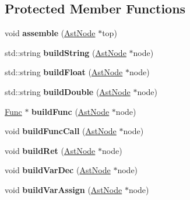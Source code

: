 \subsection*{Protected Member Functions}
\begin{DoxyCompactItemize}
\item 
\mbox{\label{classPasmBuilder_a463abff1f78a43e9d54787b6ceeb9d7e}} 
void {\bfseries assemble} (\hyperlink{classAstNode}{Ast\+Node} $\ast$top)
\item 
\mbox{\label{classPasmBuilder_ab7ac4503150face7cd84a1d5d739440a}} 
std\+::string {\bfseries build\+String} (\hyperlink{classAstNode}{Ast\+Node} $\ast$node)
\item 
\mbox{\label{classPasmBuilder_a9cf25d3db0c124184763e844d597dbc8}} 
std\+::string {\bfseries build\+Float} (\hyperlink{classAstNode}{Ast\+Node} $\ast$node)
\item 
\mbox{\label{classPasmBuilder_a253a58ef8c8e73b7c9760b24946c92d0}} 
std\+::string {\bfseries build\+Double} (\hyperlink{classAstNode}{Ast\+Node} $\ast$node)
\item 
\mbox{\label{classPasmBuilder_ac07da27699d37daf9760e8ad210062fe}} 
\hyperlink{classPASM_1_1Func}{Func} $\ast$ {\bfseries build\+Func} (\hyperlink{classAstNode}{Ast\+Node} $\ast$node)
\item 
\mbox{\label{classPasmBuilder_a892d08067b9c943986cfe6675ac39864}} 
void {\bfseries build\+Func\+Call} (\hyperlink{classAstNode}{Ast\+Node} $\ast$node)
\item 
\mbox{\label{classPasmBuilder_a13b07fab1484d337937d528f055f4792}} 
void {\bfseries build\+Ret} (\hyperlink{classAstNode}{Ast\+Node} $\ast$node)
\item 
\mbox{\label{classPasmBuilder_a0eb6ab75a59094ebdd9a00a1f52b41c0}} 
void {\bfseries build\+Var\+Dec} (\hyperlink{classAstNode}{Ast\+Node} $\ast$node)
\item 
\mbox{\label{classPasmBuilder_a28e31fef2783a757145e7a1348f48a44}} 
void {\bfseries build\+Var\+Assign} (\hyperlink{classAstNode}{Ast\+Node} $\ast$node)

\end{DoxyCompactItemize}

